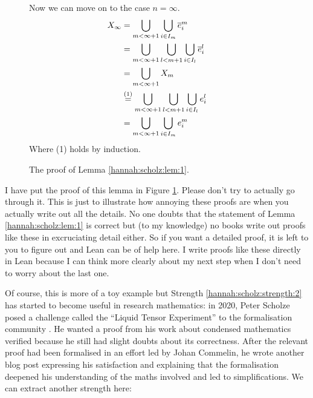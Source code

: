 \begin{figure}
\begin{framed}
\begin{minipage}[t]{0.4\linewidth}
    Now we can move on to the case $n = \infty$.
    \begin{equation*}
        \begin{split}
            X_{\infty} &= \bigcup_{m < \infty + 1}\bigcup_{i \in I_m}\closedCell{m}{i} \\
            &= \bigcup_{m < \infty + 1}\bigcup_{l < m + 1}\bigcup_{i \in I_l}\closedCell{l}{i} \\
            &= \bigcup_{m < \infty + 1} X_m \\
            &\stackrel{(1)}{=} \bigcup_{m < \infty + 1}\bigcup_{l < m + 1}\bigcup_{i \in I_l}\openCell{l}{i} \\
            &= \bigcup_{m < \infty + 1}\bigcup_{i \in I_m}\openCell{m}{i}
        \end{split}
    \end{equation*}
    Where (1) holds by induction.
        \end{minipage}
    \end{framed}
\caption{The proof of Lemma \ref{hannah:scholz:lem:1}.}
\label{hannah:scholz:fig:4}
\end{figure}

I have put the proof of this lemma in Figure \ref{hannah:scholz:fig:4}. Please don't try to actually go through it. This is just to illustrate how annoying these proofs are when you actually write out all the details. 
No one doubts that the statement of Lemma \ref{hannah:scholz:lem:1} is correct but (to my knowledge) no books write out proofs like these in excruciating detail either. So if you want a detailed proof, it is left to you to figure out and Lean can be of help here. I write proofs like these directly in Lean because I can think more clearly about my next step when I don't need to worry about the last one. 

Of course, this is more of a toy example but Strength \ref{hannah:scholz:strength:2} has started to become useful in research mathematics: in 2020, Peter Scholze posed a challenge called the ``Liquid Tensor Experiment'' to the formalisation community \cite{LiquidTensor}. He wanted a proof from his work about condensed mathematics verified because he still had slight doubts about its correctness. After the relevant proof had been formalised in an effort led by Johan Commelin, he wrote another blog post \cite{LiquidTensor2} expressing his satisfaction and explaining that the formalisation deepened his understanding of the maths involved and led to simplifications. We can extract another strength here: 

